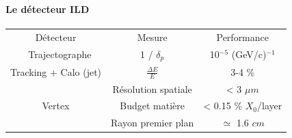 \documentclass[8pt]{beamer}
\begin{document}
  \begin{frame}
  \frametitle{\secname}
  \framesubtitle{Le détecteur ILD}
    \begin{minipage}{0.6\linewidth}
      \begin{table}
        \begin{tabular}{c|c|c}
          \hline
          \multicolumn{1}{c}{Détecteur} & \multicolumn{1}{c}{Mesure} & \multicolumn{1}{c}{Performance} \\ 
          \hline \hline
          Trajectographe & 1 / $\delta_p$                           & 10$^{-5}$ (GeV/c)$^{-1}$ \\
          Tracking + Calo (jet)   & $\frac{\Delta E}{E}$                     & 3-4 \% \\
          \multirow{3}{*}{Vertex}         & {\footnotesize Résolution spatiale}       & {\footnotesize < 3 $\mu m$} \\
          ~              & {\footnotesize Budget matière}           & {\footnotesize < 0.15 \% $X_{0}$/layer} \\
          ~              & {\footnotesize Rayon premier plan}      & {\footnotesize $\simeq$ 1.6 $cm$}
        \end{tabular}
      \end{table}
    \end{minipage} ~~\hfill
    \begin{minipage}{0.36\linewidth}
\end{minipage}
\end{frame}
\end{document}
